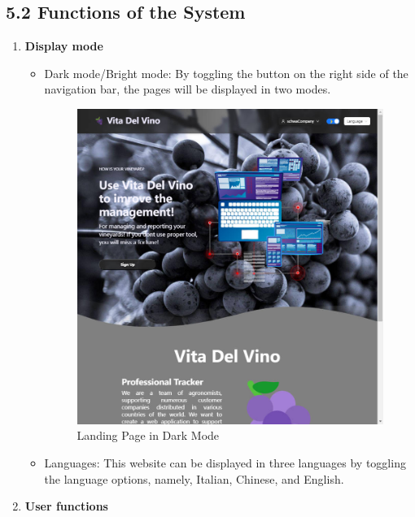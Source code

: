 \subsection{5.2 Functions of the System}
\begin{enumerate}

    \item \textbf{Display mode}
          \begin{itemize}
              \item Dark mode/Bright mode: By toggling the button on the right side of the navigation bar, the pages will be displayed in two modes.

                    \begin{figure}
                        \centering
                        \includegraphics[width=1\linewidth]{images/LandingPageDarkMode.jpg}
                        \caption{Landing Page in Dark Mode}
                        \label{fig:LandingPageDarkMode}
                    \end{figure}
              \item Languages: This website can be displayed in three languages by toggling the language options, namely, Italian, Chinese, and English.
          \end{itemize}
    \item \textbf{User functions}

\end{enumerate}
